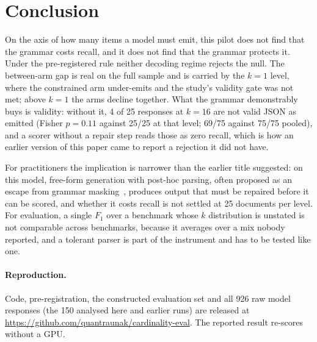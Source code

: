 \documentclass[11pt]{article}
\begin{document}
\section{Conclusion}

On the axis of how many items a model must emit, this pilot does not find that
the grammar costs recall, and it does not find that the grammar protects it.
Under the pre-registered rule neither decoding regime rejects the null. The
between-arm gap is real on the full sample and is carried by the $k = 1$ level,
where the constrained arm under-emits and the study's validity gate was not met;
above $k = 1$ the arms decline together. What the grammar demonstrably buys is
validity: without it, 4 of 25 responses at $k = 16$ are not valid JSON as
emitted (Fisher $p = 0.11$ against 25/25 at that level; 69/75 against 75/75 pooled), and a scorer without a repair step reads those as zero recall, which is
how an earlier version of this paper came to report a rejection it did not have.

For practitioners the implication is narrower than the earlier title suggested:
on this model, free-form generation with post-hoc parsing, often proposed as an
escape from grammar masking~\citep{letmespeak}, produces output that must be repaired before it can be scored, and whether it
costs recall is not settled at 25 documents per level. For evaluation, a single
$F_1$ over a benchmark whose $k$ distribution is unstated is not comparable across
benchmarks, because it averages over a mix nobody reported, and a tolerant parser
is part of the instrument and has to be tested like one.

\paragraph{Reproduction.} Code, pre-registration, the constructed evaluation set
and all 926 raw model responses (the 150 analysed here and earlier runs) are released at
\url{https://github.com/quantraunak/cardinality-eval}. The reported result
re-scores without a GPU.
\end{document}
